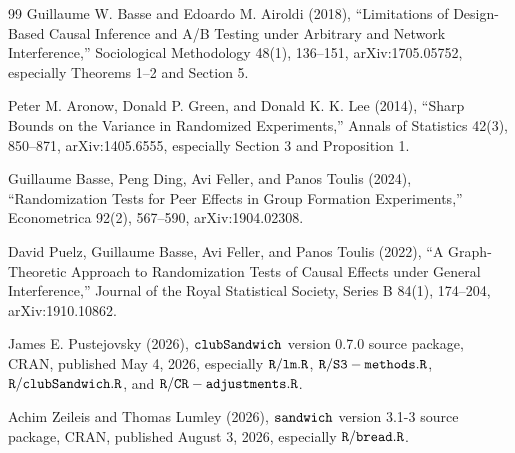 \documentclass{article}
\begin{document}
\begin{thebibliography}{99}
   Guillaume W. Basse and Edoardo M. Airoldi (2018), ``Limitations of Design-Based Causal Inference and A/B Testing under Arbitrary and Network Interference,'' Sociological Methodology 48(1), 136--151, arXiv:1705.05752, especially Theorems 1--2 and Section 5.

   Peter M. Aronow, Donald P. Green, and Donald K. K. Lee (2014), ``Sharp Bounds on the Variance in Randomized Experiments,'' Annals of Statistics 42(3), 850--871, arXiv:1405.6555, especially Section 3 and Proposition 1.

   Guillaume Basse, Peng Ding, Avi Feller, and Panos Toulis (2024), ``Randomization Tests for Peer Effects in Group Formation Experiments,'' Econometrica 92(2), 567--590, arXiv:1904.02308.

   David Puelz, Guillaume Basse, Avi Feller, and Panos Toulis (2022), ``A Graph-Theoretic Approach to Randomization Tests of Causal Effects under General Interference,'' Journal of the Royal Statistical Society, Series B 84(1), 174--204, arXiv:1910.10862.

   James E. Pustejovsky (2026), \({\tt clubSandwich}\) version 0.7.0 source package, CRAN, published May 4, 2026, especially \({\tt R/lm.R}\), \({\tt R/S3-methods.R}\), \({\tt R/clubSandwich.R}\), and \({\tt R/CR-adjustments.R}\).

   Achim Zeileis and Thomas Lumley (2026), \({\tt sandwich}\) version 3.1-3 source package, CRAN, published August 3, 2026, especially \({\tt R/bread.R}\).

\end{thebibliography}
\end{document}
